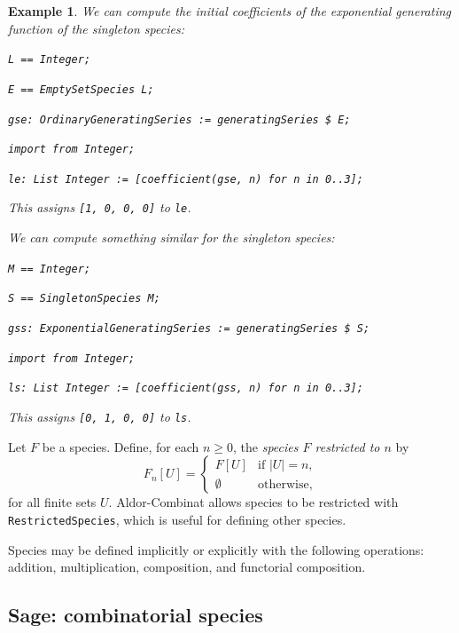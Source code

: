 \documentclass[12pt]{article}
\theoremstyle{plain}
\newtheorem{exa}{Example}
\newcommand{\codefont}[1]{{\fontshape{n}\texttt{#1}}}
\newenvironment{snippet}{\vspace{10px}\fontfamily{ppl}\selectfont}{\vspace{10px}}
\begin{document}
\begin{exa}

We can compute the initial coefficients of the exponential generating function of the singleton species:
\begin{snippet}

\codefont{L == Integer;}

\codefont{E == EmptySetSpecies L;}

\codefont{gse: OrdinaryGeneratingSeries := generatingSeries \$ E;}

\codefont{import from Integer;}

\codefont{le: List Integer := [coefficient(gse, n) for n in 0..3];}

\end{snippet}
\noindent This assigns \codefont{[1, 0, 0, 0]} to \codefont{le}.

We can compute something similar for the singleton species:
\begin{snippet}

\codefont{M == Integer;}

\codefont{S == SingletonSpecies M;}

\codefont{gss: ExponentialGeneratingSeries := generatingSeries \$ S;}

\codefont{import from Integer;}

\codefont{ls: List Integer := [coefficient(gss, n) for n in 0..3];}
\end{snippet}

\noindent This assigns \codefont{[0, 1, 0, 0]} to \codefont{ls}.
\end{exa}

Let \( F \) be a species.
Define, for each \( n \geq 0 \), the \emph{species \( F \) restricted to \( n \)} by
\[ F_n[U] = \begin{cases}
 F[U] & \text{if } |U|=n, \\
 \emptyset & \text{otherwise},
\end{cases}
\]
for all finite sets \( U \).
Aldor-Combinat allows species to be restricted with \codefont{RestrictedSpecies},
which is useful for defining other species.

Species may be defined implicitly or explicitly with the following
operations:
addition,
multiplication,
composition, and
functorial composition.




\subsection{Sage: combinatorial species}
\label{sec:sagespecies}
\end{document}
